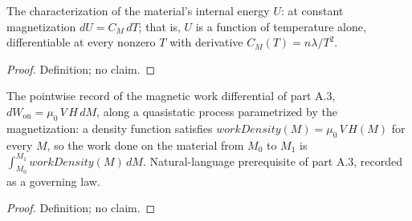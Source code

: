 \begin{definition}
\label{def:IPhO2026Problems_problem_IPhO_2026_3_B_1:HasHeatCapacityLaw}
The characterization of the material's internal energy $U$: at constant
magnetization $dU = C_M\,dT$; that is, $U$ is a function of temperature
alone, differentiable at every nonzero $T$ with derivative
$C_M(T) = n\lambda/T^2$.
\end{definition}
\begin{proof}
Definition; no claim.
\end{proof}

\begin{definition}
\label{def:IPhO2026Problems_problem_IPhO_2026_3_B_1:IsMagneticWorkDensity}
The pointwise record of the magnetic work differential of part A.3,
$dW_{\mathrm{on}} = \mu_0\,V\,H\,dM$, along a quasistatic process
parametrized by the magnetization: a density function satisfies
$\mathit{workDensity}(M) = \mu_0\,V\,H(M)$ for every $M$, so the work done
on the material from $M_0$ to $M_1$ is
$\int_{M_0}^{M_1} \mathit{workDensity}(M)\,dM$.  Natural-language
prerequisite of part A.3, recorded as a governing law.
\end{definition}
\begin{proof}
Definition; no claim.
\end{proof}

